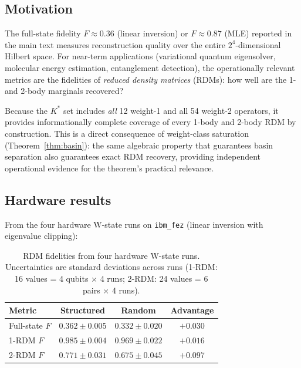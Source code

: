 \documentclass[twocolumn,prx,aps,superscriptaddress,longbibliography,floatfix]{revtex4-2}
\begin{document}
\subsection{Motivation}

The full-state fidelity $F \approx 0.36$ (linear inversion) or
$F \approx 0.87$ (MLE) reported in the main text measures
reconstruction quality over the entire $2^4$-dimensional Hilbert
space.  For near-term applications (variational quantum eigensolver, molecular energy
estimation, entanglement detection), the operationally relevant
metrics are the fidelities of \emph{reduced density matrices}
(RDMs): how well are the 1- and 2-body marginals recovered?

Because the $K^*$ set includes \emph{all} 12 weight-1 and all 54
weight-2 operators, it provides informationally complete coverage
of every 1-body and 2-body RDM by construction.
This is a direct consequence of weight-class saturation
(Theorem~\ref{thm:basin}): the same algebraic property that
guarantees basin separation also guarantees exact RDM recovery,
providing independent operational evidence for the theorem's
practical relevance.

\subsection{Hardware results}

From the four hardware W-state runs on \texttt{ibm\_fez} (linear
inversion with eigenvalue clipping):

\begin{table}[ht!]
\caption{RDM fidelities from four hardware W-state runs.
Uncertainties are standard deviations across runs (1-RDM: 16
values = 4 qubits $\times$ 4 runs; 2-RDM: 24 values = 6 pairs
$\times$ 4 runs).}
\label{tab:rdm}
\begin{ruledtabular}
\begin{tabular}{lccc}
Metric & Structured & Random & Advantage \\
\hline
Full-state $F$ & $0.362 \pm 0.005$ & $0.332 \pm 0.020$ & $+0.030$ \\
1-RDM $F$ & $\mathbf{0.985 \pm 0.004}$ & $0.969 \pm 0.022$ & $+0.016$ \\
2-RDM $F$ & $\mathbf{0.771 \pm 0.031}$ & $0.675 \pm 0.045$ & $+0.097$ \\
\end{tabular}
\end{ruledtabular}
\end{table}
\end{document}
